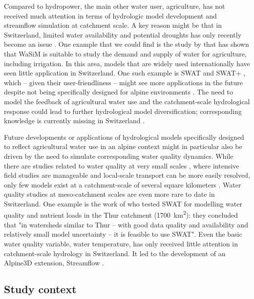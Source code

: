 \documentclass[10pt,a4paper]{article}
\begin{document}
Compared to hydropower, the main other water user, agriculture, has not received much attention in terms of hydrologic model development and streamflow simulation at catchment scale. A key reason might be that in Switzerland, limited water availability and potential droughts has only recently become an issue \citep{FOEN2021}. One example that we could find is the study by \citet{Fuhrer2012} that has shown that WaSiM is suitable to study the demand and supply of water for agriculture, including irrigation. In this area, models that are widely used internationally have seen little application in Switzerland. One such example is SWAT and SWAT+ \citep{Bieger2017}, which -- given their user-friendliness \citep{Abbaspour2007} -- might see more applications in the future despite not being specifically designed for alpine environments \citep{Rahman2014, Andrianaki2019}. The need to model the feedback of agricultural water use and the catchment-scale hydrological response could lead to further hydrological model diversification; corresponding knowledge is currently missing in Switzerland \citep{FOEN2021}.

Future developments or applications of hydrological models specifically designed to reflect agricultural water use in an alpine context might in particular also be driven by the need to simulate corresponding water quality dynamics. While there are studies related to water quality at very small scales \citep[area of less than 2~km\textsuperscript{2}; see for example][]{Frey2011, Gassmann2013, Ammann2020}, where intensive field studies are manageable and local-scale transport can be more easily resolved, only few models exist at a catchment-scale of several square kilometers \citep{Wittmer2016}. Water quality studies at meso-catchment scales are even more rare to date in Switzerland. One example is the work of \citet{Abbaspour2007} who tested SWAT for modelling water quality and nutrient loads in the Thur catchment (1700~km\textsuperscript{2}): they concluded that "in watersheds similar to Thur – with good data quality and availability and relatively small model uncertainty – it is feasible to use SWAT". Even the basic water quality variable, water temperature, has only received little attention in catchment-scale hydrology in Switzerland. It led to the development of an Alpine3D extension, Streamflow \citep{Gallice2016, Michel2021}.


\subsection{Study context}
\label{sec:context:application}
\end{document}
